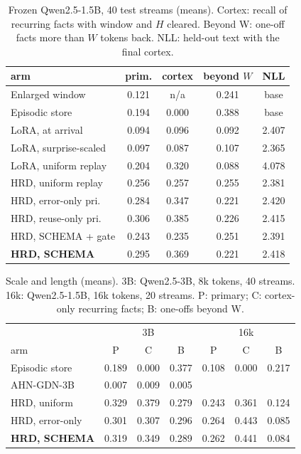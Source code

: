 \documentclass[letterpaper,10pt,twocolumn]{article}
\begin{document}
\begin{table}[t]
\centering\small
\caption{Frozen Qwen2.5-1.5B, 40 test streams (means). Cortex: recall of recurring facts with window and $H$ cleared. Beyond W: one-off facts more than $W$ tokens back. NLL: held-out text with the final cortex.}
\label{tab:neural}
\footnotesize\setlength{\tabcolsep}{3pt}
\begin{tabular}{@{}lcccc@{}}
\toprule
arm & prim. & cortex & beyond $W$ & NLL\\
\midrule
Enlarged window & 0.121 & n/a & 0.241 & base\\
Episodic store & 0.194 & 0.000 & 0.388 & base\\
LoRA, at arrival & 0.094 & 0.096 & 0.092 & 2.407\\
LoRA, surprise-scaled & 0.097 & 0.087 & 0.107 & 2.365\\
LoRA, uniform replay & 0.204 & 0.320 & 0.088 & 4.078\\
HRD, uniform replay & 0.256 & 0.257 & 0.255 & 2.381\\
HRD, error-only pri. & 0.284 & 0.347 & 0.221 & 2.420\\
HRD, reuse-only pri. & 0.306 & 0.385 & 0.226 & 2.415\\
HRD, SCHEMA + gate & 0.243 & 0.235 & 0.251 & 2.391\\
\textbf{HRD, SCHEMA} & 0.295 & 0.369 & 0.221 & 2.418\\
\bottomrule
\end{tabular}
\end{table}

\begin{table}[t]
\centering\small
\caption{Scale and length (means). 3B: Qwen2.5-3B, 8k tokens, 40 streams. 16k: Qwen2.5-1.5B, 16k tokens, 20 streams. P: primary; C: cortex-only recurring facts; B: one-offs beyond W.}
\label{tab:scale}
\footnotesize\setlength{\tabcolsep}{2.2pt}
\begin{tabular}{@{}lcccccc@{}}
\toprule
& \multicolumn{3}{c}{3B} & \multicolumn{3}{c}{16k}\\
arm & P & C & B & P & C & B\\
\midrule
Episodic store & 0.189 & 0.000 & 0.377 & 0.108 & 0.000 & 0.217\\
AHN-GDN-3B & 0.007 & 0.009 & 0.005 &  &  & \\
HRD, uniform & 0.329 & 0.379 & 0.279 & 0.243 & 0.361 & 0.124\\
HRD, error-only & 0.301 & 0.307 & 0.296 & 0.264 & 0.443 & 0.085\\
\textbf{HRD, SCHEMA} & 0.319 & 0.349 & 0.289 & 0.262 & 0.441 & 0.084\\
\bottomrule
\end{tabular}
\end{table}
\end{document}
